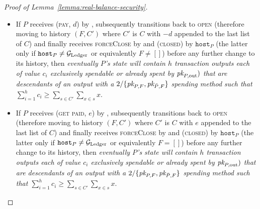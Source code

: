 \begin{proof}[Proof of Lemma~\ref{lemma:real-balance-security}]
\begin{itemize}
    change to its history, then \emph{eventually $P$'s \ledger state will
    contain $h$ transaction outputs each of value $c_i$ exclusively spendable or
    already spent by $\pk{P, \mathrm{out}})$ that are descendants of an output
    with spending method $2/\{\pk{P, F}, \pk{\bar{P}, F}\}$ such that
    $\sum\limits_{i=1}^h c_i \geq \sum\limits_{s \in C} \sum\limits_{x \in s}
    x$}. Furthermore, given that $P$ moves to the \textsc{open} state after the
    (\textsc{virtualising}, $\dots$) message and in case it sends
    (\textsc{funded}, $\dots$) to some party $R$
    (Fig.~\ref{code:ln:virtualise:start-end},
    l.~\ref{code:ln:virtualise:start-end:helper-output-funded}), the latter
    party is the (local, kindred) \texttt{fundee} of a new virtual channel. If
    subsequently the state of $R$ transitions to \textsc{open} (therefore
    obtaining history $(F_R, C_R)$ where $F_R = F + C$ and $C_R = [[0]]$), and
    finally receives (\textsc{forceClose}) by \environment and (\textsc{closed}) by
    $\texttt{host}_R$ ($\texttt{host}_R = \texttt{host}_P$ --
    Fig.~\ref{code:ln:bob}, l.~\ref{code:ln:bob:host}) before any further change
    to its history, then \emph{eventually $R$'s \ledger state will contain an
    output with a $2/\{\pk{R, F}, \pk{\bar{R}, F}\}$ spending method.}
    \item If $P$ receives (\textsc{pay}, $d$) by \environment, subsequently
    transitions back to \textsc{open} (therefore moving to history $(F, C')$
    where $C'$ is $C$ with $-d$ appended to the last list of $C$) and finally
    receives \textsc{forceClose} by \environment and (\textsc{closed}) by
    $\texttt{host}_P$ (the latter only if $\texttt{host}_P \neq \mathcal{G}_{\mathrm{Ledger}}$ or
    equivalently $F \neq []$) before any further change to its history, then
    \emph{eventually $P$'s \ledger state will contain $h$ transaction outputs
    each of value $c_i$ exclusively spendable or already spent by $\pk{P,
    \mathrm{out}})$ that are descendants of an output with a $2/\{\pk{P, F},
    \pk{\bar{P}, F}\}$ spending method such that $\sum\limits_{i=1}^h c_i \geq
    \sum\limits_{s \in C'} \sum\limits_{x \in s} x$}.
    \item If $P$ receives (\textsc{get paid}, $e$) by \environment, subsequently
    transitions back to \textsc{open} (therefore moving to history $(F, C')$
    where $C'$ is $C$ with $e$ appended to the last list of $C$) and finally
    receives \textsc{forceClose} by \environment and (\textsc{closed}) by
    $\texttt{host}_P$ (the latter only if $\texttt{host}_P \neq \mathcal{G}_{\mathrm{Ledger}}$ or
    equivalently $F = []$) before any further change to its history, then
    \emph{eventually $P$'s \ledger state will contain $h$ transaction outputs
    each of value $c_i$ exclusively spendable or already spent by $\pk{P,
    \mathrm{out}})$ that are descendants of an output with a $2/\{\pk{P, F},
    \pk{\bar{P}, F}\}$ spending method such that $\sum\limits_{i=1}^h c_i \geq
    \sum\limits_{s \in C'} \sum\limits_{x \in s} x$}.
  \end{itemize}


\end{proof}
